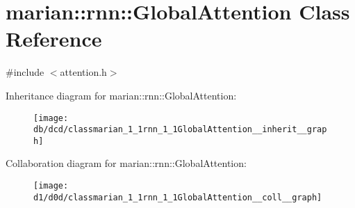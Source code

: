 \hypertarget{classmarian_1_1rnn_1_1GlobalAttention}{}\section{marian\+:\+:rnn\+:\+:Global\+Attention Class Reference}
\label{classmarian_1_1rnn_1_1GlobalAttention}


{\ttfamily \#include $<$attention.\+h$>$}



Inheritance diagram for marian\+:\+:rnn\+:\+:Global\+Attention\+:
\nopagebreak
\begin{figure}[H]
\begin{center}
\leavevmode
\texttt{[image: db/dcd/classmarian\_1\_1rnn\_1\_1GlobalAttention\_\_inherit\_\_graph]}
\end{center}
\end{figure}


Collaboration diagram for marian\+:\+:rnn\+:\+:Global\+Attention\+:
\nopagebreak
\begin{figure}[H]
\begin{center}
\leavevmode
\texttt{[image: d1/d0d/classmarian\_1\_1rnn\_1\_1GlobalAttention\_\_coll\_\_graph]}
\end{center}
\end{figure}
